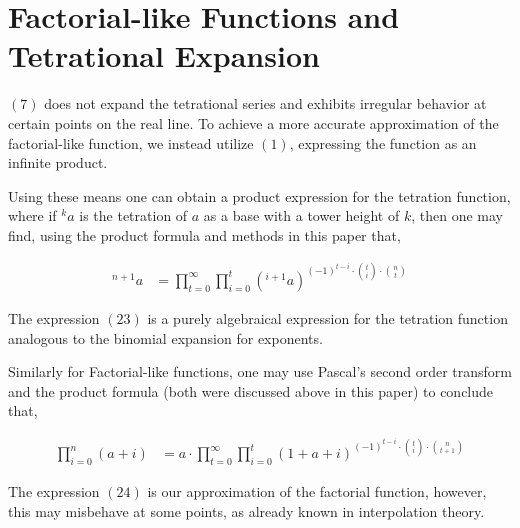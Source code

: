 \section{Factorial-like Functions and Tetrational Expansion}

$(7)$ does not expand the tetrational series and exhibits irregular behavior at certain points on the real line. To achieve a more accurate approximation of the factorial-like function, we instead utilize $(1)$, expressing the function as an infinite product.

Using these means one can obtain a product expression for the tetration function, where if $^k a$ is the tetration of $a$ as a base with a tower height of $k$, then one may find, using the product formula and methods in this paper that,

\begin{align}
^{n+1} a &= \prod_{t=0}^{\infty} \prod_{i=0}^{t} \left( {}^{i+1} a \right)^{(-1)^{t-i} \cdot \binom{t}{i} \cdot \binom{n}{t} }
\end{align}

The expression $(23)$ is a purely algebraical expression for the tetration function analogous to the binomial expansion for exponents.

Similarly for Factorial-like functions, one may use Pascal's second order transform and the product formula (both were discussed above in this paper) to conclude that,

\begin{align}
\prod_{i=0}^{n} (a+i) &= a \cdot \prod_{t=0}^{\infty} \prod_{i=0}^{t} (1+a+i)^{(-1)^{t-i} \cdot \binom{t}{i} \cdot \binom{n}{t+1}}
\end{align}

The expression $(24)$ is our approximation of the factorial function, however, this may misbehave at some points, as already known in interpolation theory.
